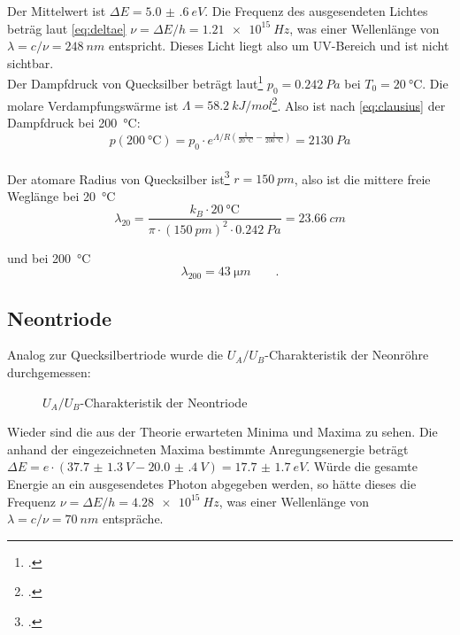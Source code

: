 Der Mittelwert ist $\Delta E=\SI{5.0(6)}{eV}$. Die Frequenz des ausgesendeten Lichtes beträg laut \cref{eq:deltae} $\nu=\Delta E/h=\SI{1.21e15}{Hz}$, was einer Wellenlänge von $\lambda=c/\nu=\SI{248}{nm}$ entspricht. Dieses Licht liegt also um UV-Bereich und ist nicht sichtbar.\\

Der Dampfdruck von Quecksilber beträgt laut\footcite{hill} $p_0=\SI{0.242}{Pa}$ bei $T_0=\SI{20}{\degreeCelsius}$. Die molare Verdampfungswärme ist $\Lambda=\SI{58.2}{kJ/mol}$\footcite{zhang}. Also ist nach \cref{eq:clausius} der Dampfdruck bei \SI{200}{\degreeCelsius}:
\begin{equation}
	p(\SI{200}{\degreeCelsius})=p_0\cdot e^{\Lambda/R(\frac{1}{\SI{20}{\degreeCelsius}}-\frac{1}{\SI{200}{\degreeCelsius}})}=\SI{2130}{Pa}
	\label{eq:dampfdruck}
\end{equation}\\

Der atomare Radius von Quecksilber ist\footcite{slater} $r=\SI{150}{pm}$, also ist die mittere freie Weglänge bei \SI{20}{\degreeCelsius}
\begin{equation}
	\lambda_{20}=\frac{k_B\cdot \SI{20}{\degreeCelsius}}{\pi\cdot (\SI{150}{pm})^2\cdot \SI{0.242}{Pa}}=\SI{23.66}{cm}
	\label{eq:weg20}
\end{equation}

und bei \SI{200}{\degreeCelsius}
\begin{equation}
	\lambda_{200}=\SI{43}{\micro m}\qquad .
	\label{eq:weg200}
\end{equation}

\subsection{Neontriode}
Analog zur Quecksilbertriode wurde die $U_A/U_B$-Charakteristik der Neonröhre durchgemessen:
\begin{figure}[H]
\centering
{}
\caption{$U_A/U_B$-Charakteristik der Neontriode}
\label{fig:neon}
\end{figure}
Wieder sind die aus der Theorie erwarteten Minima und Maxima zu sehen. Die anhand der eingezeichneten Maxima bestimmte Anregungsenergie beträgt $\Delta E=e\cdot(\SI{37.7(13)}{V}-\SI{20.0(4)}{V})=\SI{17.7(17)}{eV}$. Würde die gesamte Energie an ein ausgesendetes Photon abgegeben werden, so hätte dieses die Frequenz $\nu=\Delta E/h=\SI{4.28e15}{Hz}$, was einer Wellenlänge von $\lambda=c/\nu=\SI{70}{nm}$ entspräche. 


